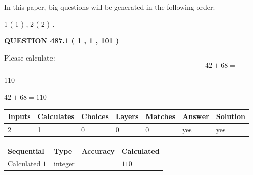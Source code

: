 \documentclass[12pt]{article}
\begin{document}
In this paper, big questions will be generated in the following order: 
   
   
   1 ( 1 )
 ,
   2 ( 2 )
 .
  
\vspace{0.2in}
  
{\textbf{\Large{QUESTION
487.1 
 ( 1 , 1 , 101 )
}}}
  
  
 
Please calculate:
\begin{equation}
42 +  %
68 = \nonumber
\end{equation}
 
 
 
\noindent{}
 
 

110
 
 
\noindent{}
 
 

 
 
 
\noindent{}
 
 

$ %
42 +  %
68=   %
110$
 
 
\noindent{}
 
 

 
   
   
   
   
\noindent\begin{tabular}{|l|l|l|l|l|l|l|}
 \hline
Inputs & Calculates & Choices & Layers & Matches & Answer & Solution \\ \hline
 2  & 
 1  & 
 0
  & 
 0  & 
 0  & 
  yes & 
  yes 
  \\ \hline
 \end{tabular}
   
   
   
   
\noindent{}
   
   
  
  
\noindent\begin{tabular}{|l|l|l|l|}
\hline
 Sequential & Type & Accuracy & Calculated \\ 
\hline
 
 
  Calculated $  1 $ & integer &  & 
  $ 110 $ 
 \\  \hline  
 \end{tabular}
   
\end{document}

